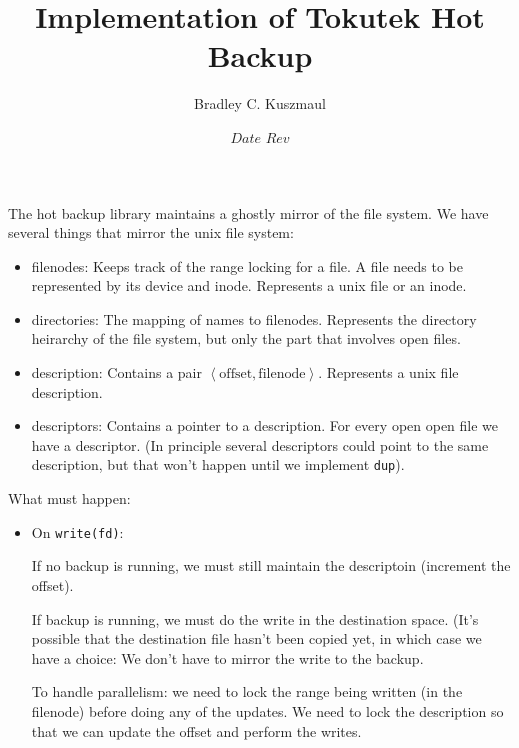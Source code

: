 \documentclass[10pt]{article}
\title{Implementation of Tokutek Hot Backup}
\author{Bradley C. Kuszmaul}
\date{$Date$  $Rev$}
\begin{document}
\maketitle

The hot backup library maintains a ghostly mirror of the file system.  We have several things that mirror the unix file system:
\begin{itemize}
\item filenodes: Keeps track of the range locking for a file.  A file needs to be represented by its device and inode.  Represents a unix file or an inode.
\item directories: The mapping of names to filenodes. Represents the directory heirarchy of the file system, but only the part that involves open files.
\item description: Contains a pair $\left<\mbox{offset},\mbox{filenode}\right>$.  Represents a unix file description.
\item descriptors: Contains a pointer to a description.  For every open open file we have a descriptor.  (In principle several descriptors could point to the same description, but that won't happen until we implement \texttt{dup}).
\end{itemize}

What must happen:
\begin{itemize}
\item On \texttt{write(fd)}: 

 If no backup is running, we must still maintain the descriptoin (increment the offset).

 If backup is running, we must do the write in the destination space.
 (It's possible that the destination file hasn't been copied yet, in
 which case we have a choice: We don't have to mirror the write to the
 backup.

 To handle parallelism: we need to lock the range being written (in the filenode) before doing any of the updates.
  We need to lock the description so that we can update the offset and perform the writes.

\end{itemize}
\end{document}
